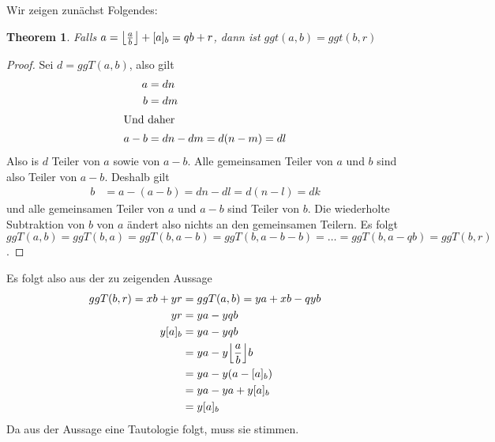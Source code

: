 \documentclass{../crypto}
\newtheorem{theorem}{Theorem}
\begin{document}
\subsection{}
\subsection{}
\subsection{}

Wir zeigen zunächst Folgendes:

\begin{theorem}
Falls $a = \floor*{\frac{a}{b}} + [a]_b = qb + r$, dann
   ist $ggt(a,b) = ggt(b,r)$
\end{theorem}
\begin{proof}
   Sei $d=ggT(a,b)$, also gilt
   \begin{align*}
      a & = dn \\
      b & = dm \\
      \intertext{Und daher}
      a - b & = dn - dm  = d(n-m) = dl
   \end{align*}
   Also is $d$ Teiler von $a$ sowie von $a-b$. Alle gemeinsamen Teiler von $a$
   und $b$ sind also Teiler von $a-b$. Deshalb gilt
   \begin{align*}
      b & = a - (a - b) = dn - dl = d(n - l) = dk
   \end{align*}
   und alle gemeinsamen Teiler von $a$ und $a-b$ sind Teiler von $b$. Die
   wiederholte Subtraktion von $b$ von $a$ ändert also nichts an den gemeinsamen
   Teilern. Es folgt $ggT(a,b) = ggT(b,a) = ggT(b, a - b) = ggT(b, a - b - b) =
   \ldots = ggT(b, a - qb) = ggT(b,r)$.
\end{proof}

Es folgt also aus der zu zeigenden Aussage
\begin{align*}
   ggT(b,r) = xb + yr & = ggT(a,b) = ya + xb - qyb \\
            yr & = ya - yqb \\
            y [a]_b & = ya - yqb \\
                    & = ya -y \floor*{\frac{a}{b}} b \\
                    & = ya - y(a - [a]_b) \\
                    & = ya - ya + y [a]_b \\
                    & = y [a]_b
\end{align*}
Da aus der Aussage eine Tautologie folgt, muss sie stimmen.
\end{document}
